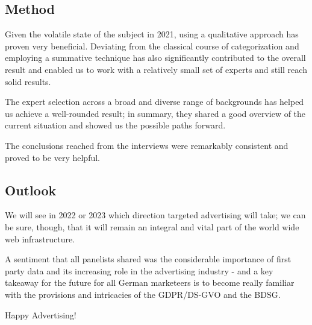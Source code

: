 \subsection{Method}

Given the volatile state of the subject in 2021, using a qualitative approach has proven very beneficial. Deviating from the classical course of categorization and employing a summative technique has also significantly contributed to the overall result and enabled us to work with a relatively small set of experts and still reach solid results.

The expert selection across a broad and diverse range of backgrounds has helped us achieve a well-rounded result; in summary, they shared a good overview of the current situation and showed us the possible paths forward.

The conclusions reached from the interviews were remarkably consistent and proved to be very helpful.

\subsection{Outlook}

We will see in 2022 or 2023 which direction targeted advertising will take; we can be sure, though, that it will remain an integral and vital part of the world wide web infrastructure.

A sentiment that all panelists shared was the considerable importance of first party data and its increasing role in the advertising industry - and a key takeaway for the future for all German marketeers is to become really familiar with the provisions and intricacies of the GDPR/DS-GVO and the BDSG.

\par\medskip

Happy Advertising!
